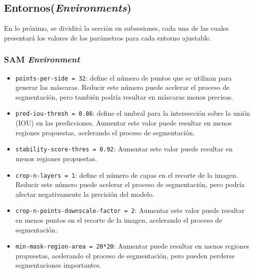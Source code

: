 \subsection{Entornos(\textit{Environments})}
En lo próximo, se dividirá la sección en subsesiones, cada una de las cuales presentará los valores de los parámetros para cada entorno ajustable.

\subsubsection*{SAM \textit{Environment}}
\begin{itemize}
\item \verb|points-per-side = 32|: define el número de puntos que se utilizan para generar las máscaras. Reducir este número puede acelerar el proceso de segmentación, pero también podría resultar en máscaras menos precisas.
\item \verb|pred-iou-thresh = 0.86|: define el umbral para la intersección sobre la unión (IOU) en las predicciones. Aumentar este valor puede resultar en menos regiones propuestas, acelerando el proceso de segmentación.
\item \verb|stability-score-thres = 0.92|: Aumentar este valor puede resultar en menos regiones propuestas.
\item \verb|crop-n-layers = 1|: define el número de capas en el recorte de la imagen. Reducir este número puede acelerar el proceso de segmentación, pero podría afectar negativamente la precisión del modelo.
\item \verb|crop-n-points-downscale-factor = 2|: Aumentar este valor puede resultar en menos puntos en el recorte de la imagen, acelerando el proceso de segmentación.
\item \verb|min-mask-region-area = 20*20|: Aumentar puede resultar en menos regiones propuestas, acelerando el proceso de segmentación, pero pueden perderse segmentaciones importantes.
\end{itemize}

